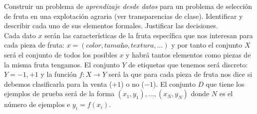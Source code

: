 \documentclass[12pt]{article}
\theoremstyle{definition}
\begin{document}
\begin{pregunta}
Construir un problema de \textit{aprendizaje desde datos} para un problema de selección de fruta en una explotación agraria (ver transparencias de clase). Identificar y describir cada uno de sus elementos formales. Justificar las decisiones.\\

Cada dato $x$ serán las características de la fruta específica que nos interesan para cada pieza de fruta: $x = (color, tamaño, textura,...)$ y por tanto el conjunto $X$ será el conjunto de todos los posibles $x$ y habrá tantos elementos como piezas de la misma fruta tengamos. El conjunto $Y$ de etiquetas que tenemos será discreto: $Y={-1,+1}$ y la función $f:X \rightarrow Y$ será la que para cada pieza de fruta nos dice si debemos clasificarla para la venta ($+1$) o no ($-1$). El conjunto $D$ que tiene los ejemplos de prueba será de la forma $(x_1,y_1),...,(x_N,y_N)$ donde $N$ es el número de ejemplos e $y_i=f(x_i)$.
\end{pregunta}
\end{document}
